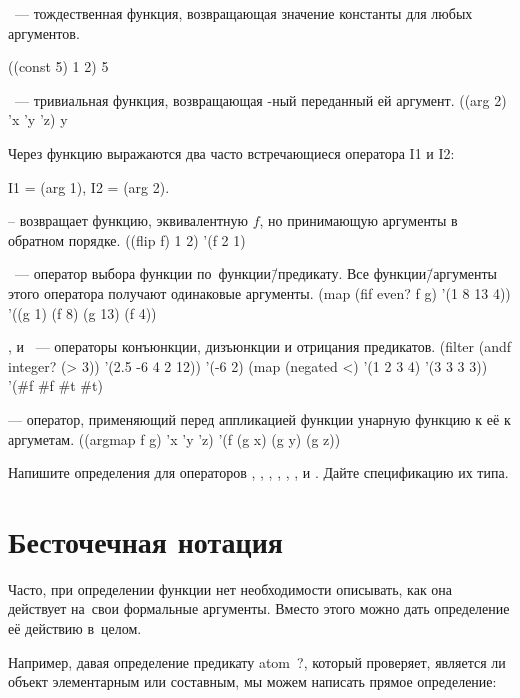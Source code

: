 \medskip
{}~--- тождественная функция, возвращающая значение константы  для любых аргументов.

\REPL
  {((const 5) 1 2)}
  {5}


\medskip
{}~--- тривиальная функция, возвращающая -ный переданный ей аргумент.
\REPL
  {((arg 2) 'x 'y 'z)}
  {y}

Через функцию  выражаются два часто встречающиеся оператора \si{I1} и \si{I2}:
\begin{SchemeCode}
  I1 = (arg 1),   I2 = (arg 2).
\end{SchemeCode}

\medskip
{} -- возвращает функцию, эквивалентную $f$, но принимающую аргументы в обратном порядке.
\REPL
  {((flip f) 1 2)}
  {'(f 2 1)}

\medskip
{}~--- оператор выбора функции по~функции\=/предикату. Все функции\=/аргументы этого оператора получают одинаковые аргументы.
\REPL
 {(map (fif even? f g) '(1 8 13 4))}
 {'((g 1) (f 8) (g 13) (f 4))}

\medskip
{},  и ~--- операторы конъюнкции, дизъюнкции и отрицания предикатов.
\REPL
  {(filter (andf integer? (> 3)) '(2.5 -6 4 2 12))}
  {'(-6 2)}
\REPL
  {(map (negated <) '(1 2 3 4) '(3 3 3 3))}
  {'(#f #f #t #t)}

\medskip
{} --- оператор, применяющий перед аппликацией функции  унарную функцию  к её к аргуметам.
\REPL
  {((argmap f g) 'x 'y 'z)}
  {'(f (g x) (g y) (g z))}

\begin{Assignment}
Напишите определения для операторов , , , , , ,  и . Дайте спецификацию их типа.
\end{Assignment}

\section[2]{Бесточечная нотация}\label{tacit}%
Часто, при определении функции нет необходимости описывать, как она действует на~свои формальные аргументы. Вместо этого можно дать определение её действию в~целом.

Например, давая определение предикату \si{atom?}, который проверяет, является ли объект элементарным или составным, мы можем написать прямое определение:

